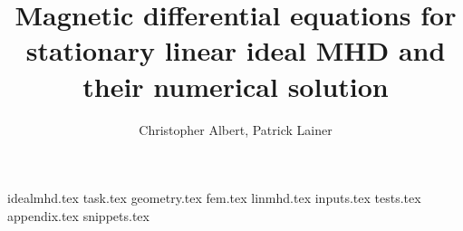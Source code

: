 \documentclass[a4paper, twoside, 10pt, english]{article}
\title{Magnetic differential equations for stationary linear ideal MHD and their numerical solution}
\author{Christopher Albert, Patrick Lainer}
\numberwithin{equation}{section}
\begin{document}
\maketitle
{}
\tableofcontents
\clearpage
{idealmhd.tex}
{task.tex}
{geometry.tex}
{fem.tex}
{linmhd.tex}
{inputs.tex}
{tests.tex}
\appendix
{appendix.tex}
{snippets.tex}
\printbibliography[heading=bibintoc]
\end{document}
